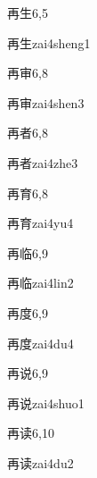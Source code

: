\begin{entry}{再生}{6,5}
  \begin{phonetics}{再生}{zai4sheng1}
  \end{phonetics}
\end{entry}

\begin{entry}{再审}{6,8}
  \begin{phonetics}{再审}{zai4shen3}
  \end{phonetics}
\end{entry}

\begin{entry}{再者}{6,8}
  \begin{phonetics}{再者}{zai4zhe3}
  \end{phonetics}
\end{entry}

\begin{entry}{再育}{6,8}
  \begin{phonetics}{再育}{zai4yu4}
  \end{phonetics}
\end{entry}

\begin{entry}{再临}{6,9}
  \begin{phonetics}{再临}{zai4lin2}
  \end{phonetics}
\end{entry}

\begin{entry}{再度}{6,9}
  \begin{phonetics}{再度}{zai4du4}
  \end{phonetics}
\end{entry}

\begin{entry}{再说}{6,9}
  \begin{phonetics}{再说}{zai4shuo1}
  \end{phonetics}
\end{entry}

\begin{entry}{再读}{6,10}
  \begin{phonetics}{再读}{zai4du2}
  \end{phonetics}
\end{entry}

